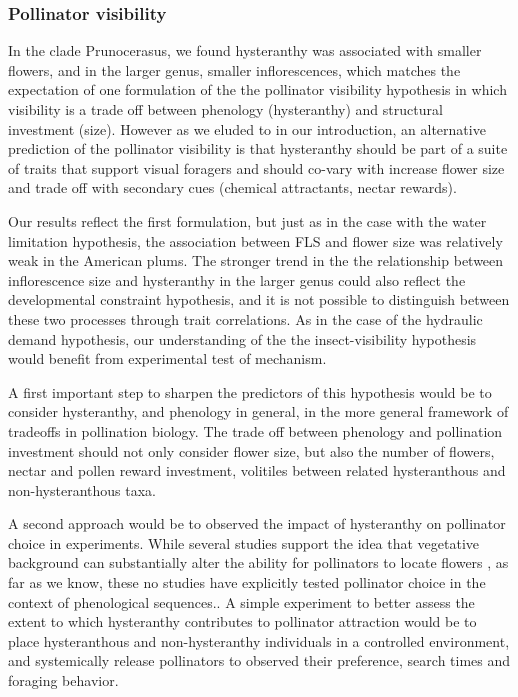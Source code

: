 \documentclass{article}[11pt]
\begin{document}
\subsubsection*{Pollinator visibility}
In the clade Prunocerasus, we found hysteranthy was associated with smaller flowers, and in the larger genus, smaller inflorescences, which matches the expectation of one formulation of the the pollinator visibility hypothesis in which visibility is a trade off between phenology (hysteranthy) and structural investment (size). However as we eluded to in our introduction, an alternative prediction of the pollinator visibility is that hysteranthy should be part of a suite of traits that support visual foragers and should co-vary with increase flower size and trade off with secondary cues (chemical attractants, nectar rewards).

Our results reflect the first formulation, but just as in the case with the water limitation hypothesis, the association between FLS and flower size was relatively weak in the American plums. The stronger trend in the the relationship between inflorescence size and hysteranthy in the larger genus could also reflect the developmental constraint hypothesis, and it is not possible to distinguish between these two processes through trait correlations. As in the case of the hydraulic demand hypothesis, our understanding of the the insect-visibility hypothesis would benefit from experimental test of mechanism.

A first important step to sharpen the predictors of this hypothesis would be to consider hysteranthy, and phenology in general, in the more general framework of tradeoffs in pollination biology. The trade off between phenology and pollination investment should not only consider flower size, but also the number of flowers, nectar and pollen reward investment, volitiles between related hysteranthous and non-hysteranthous taxa. 

A second approach would be to observed the impact of hysteranthy on pollinator choice in experiments. While several studies support the idea that vegetative background can substantially alter the ability for pollinators to locate flowers \citep{Forrest:2009aa,Rivest:2017aa,Spaethe3898}, as far as we know, these no studies have explicitly tested pollinator choice in the context of phenological sequences.. A simple experiment to better assess the extent to which hysteranthy contributes to pollinator attraction would be to place hysteranthous and non-hysteranthy individuals in a controlled environment, and systemically release pollinators to observed their preference, search times and foraging behavior.
\end{document}

